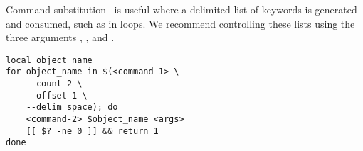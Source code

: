 Command substitution~\cite{command_substitution} is useful where a delimited list of keywords is generated and consumed, such as in  loops. We recommend controlling these lists using the three arguments , , and .
%
\begin{graybox}
\begin{verbatim}
local object_name
for object_name in $(<command-1> \
    --count 2 \
    --offset 1 \
    --delim space); do
    <command-2> $object_name <args>
    [[ $? -ne 0 ]] && return 1
done
\end{verbatim}
\end{graybox}
